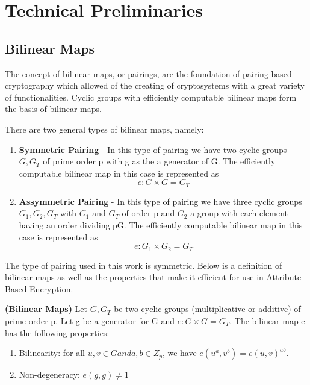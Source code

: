 \section{Technical Preliminaries}

\subsection{Bilinear Maps}

The concept of bilinear maps, or pairings, are the foundation of pairing based cryptography which allowed of the creating of cryptosystems with a great variety of functionalities. Cyclic groups with efficiently computable bilinear maps form the basis of bilinear maps.

There are two general types of bilinear maps, namely:

\begin{enumerate}
	\item \textbf{Symmetric Pairing\cite{Lynn2007}} - In this type of pairing we have two cyclic groups $ G, G_{T} $ of prime order p with g as the a generator of G. The efficiently computable bilinear map in this case is represented as $$ e \colon G \times G = G_{T} $$
	
	\item \textbf{Assymmetric Pairing\cite{Lynn2007}} - In this type of pairing we have three cyclic groups $ G_{1}, G_{2}, G_{T} $ with $ G_{1} $ and $ G_{T} $ of order p and $ G_{2} $ a group with each element having an order dividing pG. The efficiently computable bilinear map in this case is represented as $$ e \colon G_{1} \times G_{2} = G_{T} $$
	
\end{enumerate}

The type of pairing used in this work is symmetric. Below is a definition of bilinear maps as well as the properties that make it efficient for use in Attribute Based Encryption.

\begin{definition}{\textbf{(Bilinear Maps\cite{Lynn2007})}}
	Let $ G, G_{T} $  be two cyclic groups (multiplicative or additive) of prime order p. Let g be a generator for G and  $  e \colon G \times G = G_{T} $. The bilinear map e has the following properties:
	
	\begin{enumerate}
		
		\item Bilinearity: for all $ u, v \in G and a, b \in Z_{p} $, we have $ e(u^{a}, v^{b}) = e(u, v)^{ab} $.
		
		\item Non-degeneracy: $ e(g, g) \neq 1 $
		
	\end{enumerate}
	
\end{definition}

